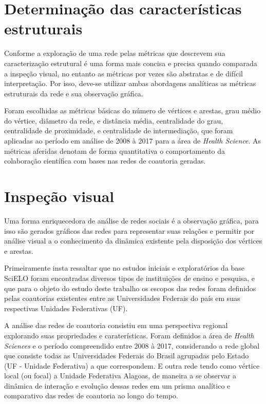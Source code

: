 \section{\textbf{Determinação das características estruturais}}

Conforme \citet{de2018exploratory} a exploração de uma rede pelas métricas que descrevem sua caracterização estrutural é uma forma mais concisa e precisa quando comparada a inspeção visual, no entanto as métricas por vezes são abstratas e de difícil interpretação. Por isso, deve-se utilizar ambas abordagens analíticas as métricas estruturais da rede e sua observação gráfica.

Foram escolhidas as métricas básicas do número de vértices e arestas, grau médio do vértice, diâmetro da rede, e distância média, centralidade do grau, centralidade de proximidade, e centralidade de intermediação, que foram aplicadas ao período em análise de 2008 à 2017 para a área de \textit{Health Science}. As métricas aferidas denotam de forma quantitativa o comportamento da colaboração científica com bases nas redes de coautoria geradas.

\section{\textbf{Inspeção visual}}

Uma forma enriquecedora de análise de redes sociais é a observação gráfica, para isso são gerados gráficos das redes para representar suas relações e permitir por análise visual a o conhecimento da dinâmica existente pela disposição dos vértices e arestas.

Primeiramente insta ressaltar que no estudos iniciais e exploratórios da base SciELO foram encontradas diversos tipos de instituições de ensino e pesquisa, e que para o objeto do estudo deste trabalho os escopos das redes foram definidos pelas coautorias existentes entre as Universidades Federais do país em suas respectivas Unidades Federativas (UF). 

A análise das redes de coautoria consistiu em uma perspectiva regional explorando suas propriedades e caraterísticas. Foram definidos a área de \textit{Health Sciences} e o período compreendido entre 2008 à 2017, considerando a rede global que consiste todas as Universidades Federais do Brasil agrupadas pelo Estado (UF - Unidade Federativa) a que correspondem. E outra rede tendo como vértice local (ou focal) a Unidade Federativa Alagoas, de maneira a se observar a dinâmica de interação e evolução dessas redes em um prisma analítico e comparativo das redes de coautoria ao longo do tempo.

